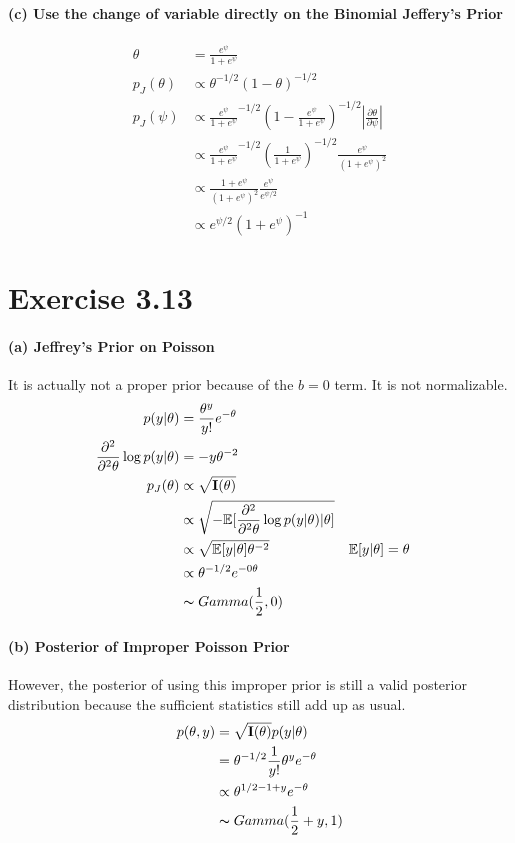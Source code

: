 \documentclass[11pt, letterpaper]{article}
\begin{document}
\paragraph{(c) Use the change of variable directly on the Binomial Jeffery's Prior}
\begin{align*}
    \theta &= \frac{e^\psi}{1+e^\psi} \\
    p_J(\theta) &\propto \theta^{-1/2} (1-\theta)^{-1/2} \\
    p_J(\psi) &\propto {\frac{e^\psi}{1+e^\psi}}^{-1/2} (1-\frac{e^\psi}{1+e^\psi})^{-1/2} |\frac{\partial \theta}{\partial \psi}| \\
        &\propto {\frac{e^\psi}{1+e^\psi}}^{-1/2} (\frac{1}{1+e^\psi})^{-1/2} \frac{e^\psi}{(1+e^\psi)^2} \\
        &\propto \frac{1+e^\psi}{(1+e^\psi)^2} \frac{e^\psi}{e^{\psi/2}} \\
        &\propto e^{\psi/2}(1+e^\psi)^{-1}
\end{align*}


\section{Exercise 3.13}
\paragraph{(a) Jeffrey's Prior on Poisson}
It is actually not a proper prior because of the $b = 0$ term. It is not normalizable.
\begin{align*}
    p(y|\theta) &= \frac{\theta^y}{y!} e^{-\theta} \\
    \frac{\partial^2}{\partial^2 \theta} \log p(y|\theta)
        &= -y\theta^{-2} \\
    p_J(\theta) &\propto \sqrt{\mathbf{I}(\theta)} \\
        &\propto \sqrt{-\mathbb{E}[\frac{\partial^2}{\partial^2 \theta} \log p(y|\theta)|\theta]} \\
        &\propto \sqrt{\mathbb{E}[y|\theta]\theta^{-2}} && \mathbb{E}[y|\theta] = \theta \\
        &\propto \theta^{-1/2} e^{-0\theta} \\
        &\thicksim Gamma(\frac{1}{2}, 0)
\end{align*}

\paragraph{(b) Posterior of Improper Poisson Prior}
However, the posterior of using this improper prior is still a valid posterior distribution because the sufficient statistics still add up as usual.
\begin{align*}
    p(\theta, y) &= \sqrt{\mathbf{I}(\theta)} p(y|\theta) \\
        &= \theta^{-1/2} \frac{1}{y!} \theta^y e^{-\theta} \\
        &\propto \theta^{1/2 - 1 + y} e^{-\theta} \\
        &\thicksim Gamma(\frac{1}{2} + y, 1)
\end{align*}
\end{document}
